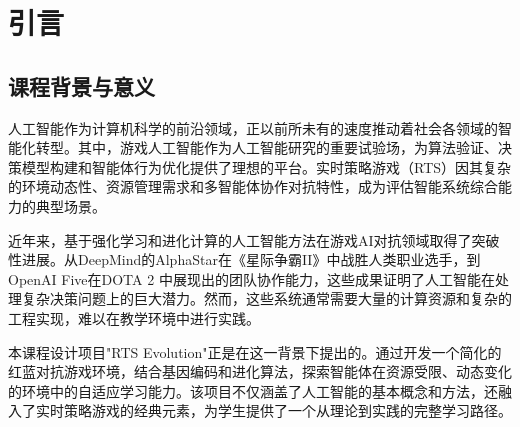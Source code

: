 \documentclass[12pt,a4paper]{article}
\begin{document}
	\begin{abstract}
		本课程设计基于人工智能与实时策略游戏（RTS）的交叉研究，开发了一个名为“RTS Evolution”的智能体演化对抗平台。项目以红蓝双方蚂蚁军团为实体，通过自主设计的基因编码表示行为策略，结合模拟学习与进化算法，在随机生成的迷宫环境中进行多轮对抗，探索智能体在资源采集、兵力调度、战斗决策等方面的自主学习与优化能力。
		
		系统采用Python与Pygame实现，包含环境构建、实体建模、AI决策、进化学习、数据分析等多个模块。核心算法基于基因编码的兵种选择偏好、行为特征参数（如攻击性、游荡性、团结性等），通过胜者基因突变传承的方式实现策略的持续进化。项目实现了对抗过程的实时可视化展示，并通过数据记录与分析模块追踪进化趋势，验证算法在复杂动态环境中的适应性与有效性。
		
		实验结果表明，本系统能够通过模拟对抗自动演化出具有战术意义的智能策略，如侦察兵偷袭、工蚁资源分配、兵力优势强攻等典型RTS战术行为，体现了基于基因编码的进化算法在解决复杂决策问题中的潜力。本项目为理解人工智能在游戏AI、自主决策系统等领域的应用提供了实践案例，也为后续研究智能体协作与对抗机制奠定了基础。
		
		\vspace{0.5cm}
		\noindent \textbf{关键词：} 人工智能；进化算法；实时策略游戏；基因编码；智能体对抗
	\end{abstract}
	
	\newpage 
	\tableofcontents
	\newpage
	
	\section{引言}
	
	\subsection{课程背景与意义}
	人工智能作为计算机科学的前沿领域，正以前所未有的速度推动着社会各领域的智能化转型。其中，游戏人工智能作为人工智能研究的重要试验场，为算法验证、决策模型构建和智能体行为优化提供了理想的平台。实时策略游戏（RTS）因其复杂的环境动态性、资源管理需求和多智能体协作对抗特性，成为评估智能系统综合能力的典型场景。
	
	近年来，基于强化学习和进化计算的人工智能方法在游戏AI对抗领域取得了突破性进展。从DeepMind的AlphaStar在《星际争霸II》中战胜人类职业选手，到OpenAI Five在DOTA 2 中展现出的团队协作能力，这些成果证明了人工智能在处理复杂决策问题上的巨大潜力。然而，这些系统通常需要大量的计算资源和复杂的工程实现，难以在教学环境中进行实践。
	
	本课程设计项目"RTS Evolution"正是在这一背景下提出的。通过开发一个简化的红蓝对抗游戏环境，结合基因编码和进化算法，探索智能体在资源受限、动态变化的环境中的自适应学习能力。该项目不仅涵盖了人工智能的基本概念和方法，还融入了实时策略游戏的经典元素，为学生提供了一个从理论到实践的完整学习路径。
	
\end{document}

